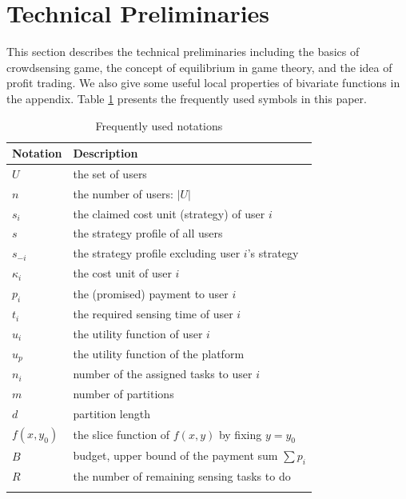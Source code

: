 \documentclass[conference]{IEEEtran}
\theoremstyle{definition}
\begin{document}
\section{Technical Preliminaries}
\label{sec:TP}
This section describes the technical preliminaries including the basics of crowdsensing game, the concept of equilibrium in game theory, and the idea of profit trading. We also give some useful local properties of bivariate functions in the appendix. Table \ref{tab:symbol_list} presents the frequently used symbols in this paper.
\begin{table}[!t]
\caption{Frequently used notations}
\label{tab:symbol_list}
\begin{tabular}{l l}
\toprule
Notation & Description\\
\hline
$U$ & the set of users\\
$n$ & the number of users: $|U|$ \\
$s_i$ & the claimed cost unit (strategy) of user $i$\\
$s$ & the strategy profile of all users \footnotemark[1]\\
$s_{-i}$ & the strategy profile excluding user $i$'s strategy\\
$\kappa_i$ & the cost unit of user $i$\\
$p_i$ & the (promised) payment to user $i$\\
$t_i$ & the required sensing time of user $i$\\
$u_i$ & the utility function of user $i$\\
$u_p$ & the utility function of the platform\\
$n_i$ & number of the assigned tasks to user $i$\\
$m$	& number of partitions\\
$d$ & partition length\\
$f(x, y_0)$ & the slice function of $f(x,y)$ by fixing $y = y_0$\\
$B$ & budget, upper bound of the payment sum $\sum p_i$\\
$R$ & the number of remaining sensing tasks to do\\
\bottomrule
\smallskip
\end{tabular}
\end{table}
\addtocounter{footnote}{1}
\end{document}

